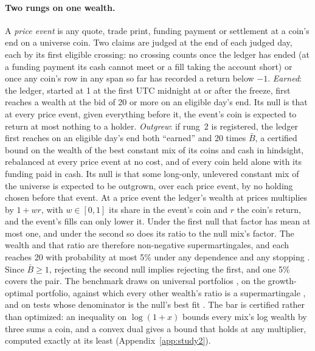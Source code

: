 \documentclass[11pt]{article}
\begin{document}
\paragraph{Two rungs on one wealth.} A \emph{price event} is any quote, trade print, funding payment or settlement at a coin's end on a universe coin. Two claims are judged at the end of each judged day, each by its first eligible crossing: no crossing counts once the ledger has ended (at a funding payment its cash cannot meet or a fill taking the account short) or once any coin's row in any span so far has recorded a return below $-1$. \emph{Earned}: the ledger, started at 1 at the first UTC midnight at or after the freeze, first reaches a wealth at the bid of 20 or more on an eligible day's end. Its null is that at every price event, given everything before it, the event's coin is expected to return at most nothing to a holder. \emph{Outgrew}: if rung~2 is registered, the ledger first reaches on an eligible day's end both ``earned'' and 20 times $\bar B$, a certified bound on the wealth of the best constant mix of its coins and cash in hindsight, rebalanced at every price event at no cost, and of every coin held alone with its funding paid in cash. Its null is that some long-only, unlevered constant mix of the universe is expected to be outgrown, over each price event, by no holding chosen before that event. At a price event the ledger's wealth at prices multiplies by $1+wr$, with $w\in[0,1]$ its share in the event's coin and $r$ the coin's return, and the event's fills can only lower it. Under the first null that factor has mean at most one, and under the second so does its ratio to the null mix's factor. The wealth and that ratio are therefore non-negative supermartingales, and each reaches 20 with probability at most 5\% under any dependence and any stopping \cite{ville1939,shafervovk2019}. Since $\bar B\ge1$, rejecting the second null implies rejecting the first, and one 5\% covers the pair. The benchmark draws on universal portfolios \cite{cover1991}, on the growth-optimal portfolio, against which every other wealth's ratio is a supermartingale \cite{long1990,covertom2006}, and on tests whose denominator is the null's best fit \cite{wasserman2020}. The bar is certified rather than optimized: an inequality on $\log(1+x)$ bounds every mix's log wealth by three sums a coin, and a convex dual gives a bound that holds at any multiplier, computed exactly at its least (Appendix~\ref{app:study2}).
\end{document}

